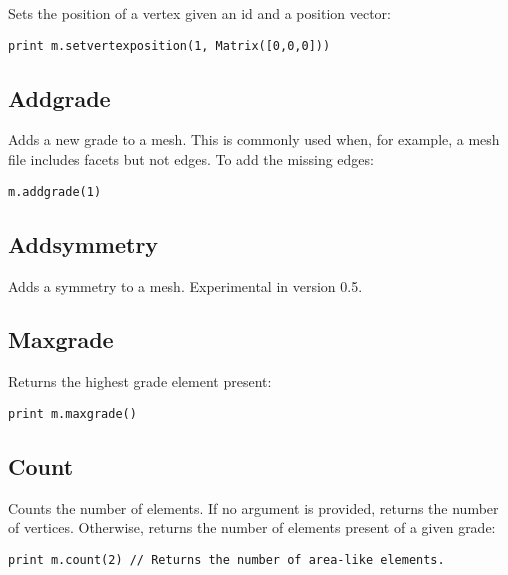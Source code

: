 Sets the position of a vertex given an id and a position vector:

\begin{lstlisting}
print m.setvertexposition(1, Matrix([0,0,0]))
\end{lstlisting}

\hypertarget{addgrade}{%
\subsection{Addgrade}\label{addgrade}}

Adds a new grade to a mesh. This is commonly used when, for example, a
mesh file includes facets but not edges. To add the missing edges:

\begin{lstlisting}
m.addgrade(1)
\end{lstlisting}

\hypertarget{addsymmetry}{%
\subsection{Addsymmetry}\label{addsymmetry}}

Adds a symmetry to a mesh. Experimental in version 0.5.

\hypertarget{maxgrade}{%
\subsection{Maxgrade}\label{maxgrade}}

Returns the highest grade element present:

\begin{lstlisting}
print m.maxgrade()
\end{lstlisting}

\hypertarget{count}{%
\subsection{Count}\label{count}}

Counts the number of elements. If no argument is provided, returns the
number of vertices. Otherwise, returns the number of elements present of
a given grade:

\begin{lstlisting}
print m.count(2) // Returns the number of area-like elements. 
\end{lstlisting}
